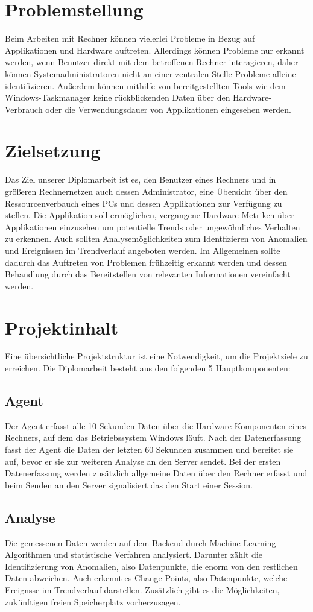 \documentclass{report}
\begin{document}
\section{Problemstellung}
Beim Arbeiten mit Rechner können vielerlei Probleme in Bezug auf Applikationen und Hardware auftreten. Allerdings können Probleme nur erkannt werden, wenn Benutzer direkt mit dem betroffenen Rechner interagieren, daher können Systemadministratoren nicht an einer zentralen Stelle Probleme alleine identifizieren. Außerdem können mithilfe von bereitgestellten Tools wie dem Windows-Taskmanager keine rückblickenden Daten über den Hardware-Verbrauch oder die Verwendungsdauer von Applikationen eingesehen werden.
\section{Zielsetzung}
Das Ziel unserer Diplomarbeit ist es, den Benutzer eines Rechners und in größeren Rechnernetzen auch dessen Administrator, eine Übersicht über den Ressourcenverbauch eines PCs und dessen Applikationen zur Verfügung zu stellen. Die Applikation soll ermöglichen, vergangene Hardware-Metriken über Applikationen einzusehen um potentielle Trends oder ungewöhnliches Verhalten zu erkennen. Auch sollten Analysemöglichkeiten zum Identfizieren von Anomalien und Ereignissen im Trendverlauf angeboten werden. Im Allgemeinen sollte dadurch das Auftreten von Problemen frühzeitig erkannt werden und dessen Behandlung durch das Bereitstellen von relevanten Informationen vereinfacht werden.
\section{Projektinhalt}
Eine übersichtliche Projektstruktur ist eine Notwendigkeit, um die Projektziele zu erreichen. Die Diplomarbeit besteht aus den folgenden 5 Hauptkomponenten:
\subsection{Agent}
Der Agent erfasst alle 10 Sekunden Daten über die Hardware-Komponenten eines Rechners, auf dem das Betriebssystem Windows läuft. Nach der Datenerfassung fasst der Agent die Daten der letzten 60 Sekunden zusammen und bereitet sie auf, bevor er sie zur weiteren Analyse an den Server sendet. Bei der ersten Datenerfassung werden zusätzlich allgemeine Daten über den Rechner erfasst und beim Senden an den Server signalisiert das den Start einer Session. 
\subsection{Analyse}
Die gemessenen Daten werden auf dem Backend durch Machine-Learning Algorithmen und statistische Verfahren analysiert. Darunter zählt die Identifizierung von Anomalien, also Datenpunkte, die enorm von den restlichen Daten abweichen. Auch erkennt es Change-Points, also Datenpunkte, welche Ereignsse im Trendverlauf darstellen. Zusätzlich gibt es die Möglichkeiten, zukünftigen freien Speicherplatz vorherzusagen.
\end{document}
